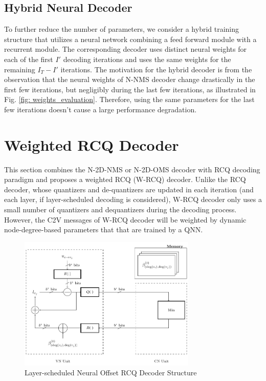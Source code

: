 \documentclass [PhD] {uclathes}
\begin{document}
\subsection{Hybrid Neural Decoder}
To further reduce the number of parameters, we consider a hybrid training structure that utilizes a neural network combining a feed forward module with a recurrent module. The corresponding decoder uses distinct neural weights for each of the first $I'$ decoding iterations and uses the same weights 
for the remaining  $I_T-I'$ iterations.
The motivation for the hybrid decoder is from the observation that the neural weights of N-NMS decoder change drastically in the first few iterations, but negligibly during the last few iterations, as illustrated in Fig. \ref{fig: weights_evaluation}. Therefore, using the same parameters for the last few iterations doesn't cause a large performance degradation. 

\section{Weighted RCQ Decoder}\label{sec: W-RCQ}
This section combines the N-2D-NMS or N-2D-OMS decoder with RCQ decoding paradigm and proposes a weighted RCQ (W-RCQ) decoder. Unlike the RCQ decoder, whose quantizers and de-quantizers are updated in each iteration (and each layer, if layer-scheduled decoding is considered), W-RCQ decoder only uses a small number of quantizers and dequantizers during the decoding process. However, the C2V messages of W-RCQ decoder will be weighted by dynamic node-degree-based parameters that that are trained by a QNN.
\begin{figure}[t]
	\centering
	\includegraphics[width=20pc]{figures/neural_rcq.pdf}
	\caption{Layer-scheduled Neural Offset RCQ Decoder Structure}
    \label{fig: layered_neural_RCQ_str}
\end{figure}
\end{document}
